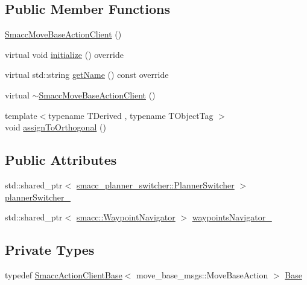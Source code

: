 \subsection*{Public Member Functions}
\begin{DoxyCompactItemize}
\item 
\hyperlink{classsmacc_1_1SmaccMoveBaseActionClient_aeb88a8a3a45c3fc5d89577316174fe00}{Smacc\+Move\+Base\+Action\+Client} ()
\item 
virtual void \hyperlink{classsmacc_1_1SmaccMoveBaseActionClient_ae520045638a5f722ad1367f6d705b7c4}{initialize} () override
\item 
virtual std\+::string \hyperlink{classsmacc_1_1SmaccMoveBaseActionClient_ac90f555fadd3b3c9394aca537a9962f4}{get\+Name} () const override
\item 
virtual \hyperlink{classsmacc_1_1SmaccMoveBaseActionClient_a10e2971e7ff4b55a1861abe233d3c24f}{$\sim$\+Smacc\+Move\+Base\+Action\+Client} ()
\item 
{\footnotesize template$<$typename T\+Derived , typename T\+Object\+Tag $>$ }\\void \hyperlink{classsmacc_1_1SmaccMoveBaseActionClient_aa06924614b5cfd73641f2f543b2e8cff}{assign\+To\+Orthogonal} ()
\end{DoxyCompactItemize}
\subsection*{Public Attributes}
\begin{DoxyCompactItemize}
\item 
std\+::shared\+\_\+ptr$<$ \hyperlink{classsmacc__planner__switcher_1_1PlannerSwitcher}{smacc\+\_\+planner\+\_\+switcher\+::\+Planner\+Switcher} $>$ \hyperlink{classsmacc_1_1SmaccMoveBaseActionClient_ae24164268108abf0b35cf51bfba5ec67}{planner\+Switcher\+\_\+}
\item 
std\+::shared\+\_\+ptr$<$ \hyperlink{classsmacc_1_1WaypointNavigator}{smacc\+::\+Waypoint\+Navigator} $>$ \hyperlink{classsmacc_1_1SmaccMoveBaseActionClient_a59b095c4c17b17dc28f4a21417b88333}{waypoints\+Navigator\+\_\+}
\end{DoxyCompactItemize}
\subsection*{Private Types}
\begin{DoxyCompactItemize}
\item 
typedef \hyperlink{classsmacc_1_1SmaccActionClientBase}{Smacc\+Action\+Client\+Base}$<$ move\+\_\+base\+\_\+msgs\+::\+Move\+Base\+Action $>$ \hyperlink{classsmacc_1_1SmaccMoveBaseActionClient_ad64340f7f8ac723bdb639c2c830975a7}{Base}
\end{DoxyCompactItemize}
